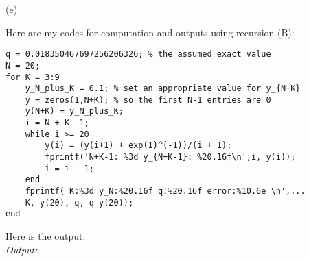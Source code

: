 \documentclass[12pt]{article}
\begin{document}
(e)

Here are my codes for computation and outputs using recursion (B):\\

\begin{lstlisting}
q = 0.018350467697256206326; % the assumed exact value
N = 20;
for K = 3:9
    y_N_plus_K = 0.1; % set an appropriate value for y_{N+K}
    y = zeros(1,N+K); % so the first N-1 entries are 0
    y(N+K) = y_N_plus_K;
    i = N + K -1;
    while i >= 20 
        y(i) = (y(i+1) + exp(1)^(-1))/(i + 1);
        fprintf('N+K-1: %3d y_{N+K-1}: %20.16f\n',i, y(i));
        i = i - 1;
    end
    fprintf('K:%3d y_N:%20.16f q:%20.16f error:%10.6e \n',...
    K, y(20), q, q-y(20));
end
\end{lstlisting}

Here is the output:\\
\emph{Output:}\\
\end{document}
